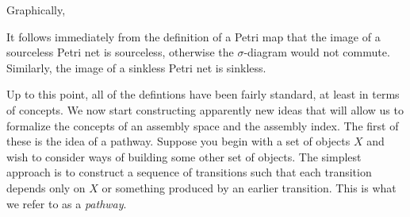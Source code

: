 \documentclass[aps,prd,onecolumn,nofootinbib,letterpaper,preprintnumbers,superscriptaddress,eqsecnum]{revtex4}
\theoremstyle{definition}
\begin{document}
Graphically,
\begin{center}
\end{center}
It follows immediately from the definition of a Petri map that the image of a sourceless Petri net is sourceless, otherwise the $\sigma$-diagram would not commute.
Similarly, the image of a sinkless Petri net is sinkless.

Up to this point, all of the defintions have been fairly standard, at least in terms of concepts.
We now start constructing apparently new ideas that will allow us to formalize the concepts of an assembly space and the assembly index.
The first of these is the idea of a pathway.
Suppose you begin with a set of objects $X$ and wish to consider ways of building some other set of objects.
The simplest approach is to construct a sequence of transitions such that each transition depends only on $X$ or something produced by an earlier transition.
This is what we refer to as a \textit{pathway}.
\end{document}
